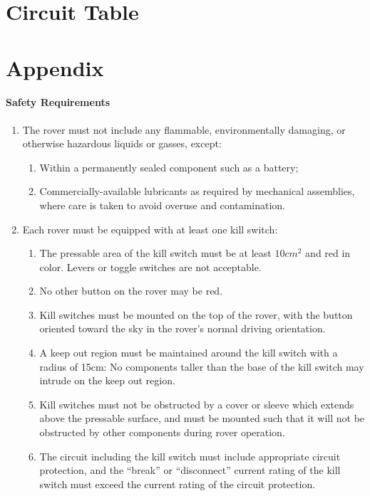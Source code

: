\section{Circuit Table}

\section{Appendix}

\paragraph{Safety Requirements}

\begin{enumerate}
    \item The rover must not include any flammable, environmentally damaging, or otherwise hazardous liquids or gasses, except:
    \begin{enumerate}
        \item Within a permanently sealed component such as a battery;
        \item Commercially-available lubricants as required by mechanical assemblies, where care is taken to avoid overuse and contamination.
    \end{enumerate}
    \item Each rover must be equipped with at least one kill switch:
    \begin{enumerate}
        \item The pressable area of the kill switch must be at least $10 cm^2$ and red in color. Levers or toggle switches are not acceptable.
        \item No other button on the rover may be red.
        \item Kill switches must be mounted on the top of the rover, with the button oriented toward the sky in the rover’s normal driving orientation.
        \item A keep out region must be maintained around the kill switch with a radius of 15cm: No components taller than the base of the kill switch may intrude on the keep out region.
        \item Kill switches must not be obstructed by a cover or sleeve which extends above the pressable surface, and must be mounted such that it will not be obstructed by other components during rover operation.
        \item The circuit including the kill switch must include appropriate circuit protection, and the “break” or “disconnect” current rating of the kill switch must exceed the current rating of the circuit protection.

\end{enumerate}
\end{enumerate}
